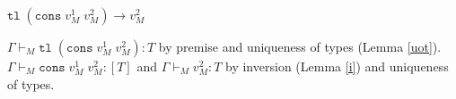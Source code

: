 \begin{case}
$\mathtt{tl}\;(\mathtt{cons}\;v_{M}^{1}\;v_{M}^{2})\rightarrow v_{M}^{2}$

$\Gamma\vdash_{M}\mathtt{tl}\;(\mathtt{cons}\;v_{M}^{1}\;v_{M}^{2}):T$ by premise and uniqueness of types (Lemma \ref{uot}).  $\Gamma\vdash_{M}\mathtt{cons}\;v_{M}^{1}\;v_{M}^{2}:[T]$ and $\Gamma\vdash_{M}v_{M}^{2}:T$ by inversion (Lemma \ref{i}) and uniqueness of types.
\end{case}